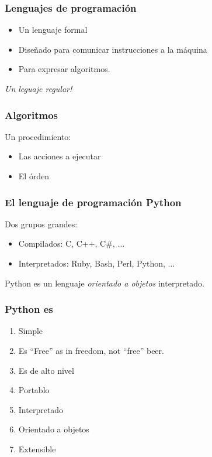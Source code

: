 \begin{frame}
\frametitle{Lenguajes de programaci\'on}
    \begin{itemize}
        \item Un lenguaje formal  \pause
        \item Dise\~nado para comunicar instrucciones a la m\'aquina \pause
        \item Para expresar algoritmos. \pause
    \end{itemize}
    \emph{ Un leguaje regular!}
\end{frame}


\begin{frame}
    \frametitle{Algoritmos}
    Un procedimiento:
    \begin{itemize}
        \item Las acciones a ejecutar
        \item El \'orden
    \end{itemize}
\end{frame}


\begin{frame}
    \frametitle{El lenguaje de programaci\'on Python}
    Dos grupos grandes:
    \begin{itemize}
        \item Compilados: C, C++, C\#, $\ldots$
        \item Interpretados: Ruby, Bash, Perl, Python, $\ldots$
    \end{itemize}
    Python es un lenguaje \emph{orientado a objetos} interpretado.
\end{frame}



\begin{frame}
    \frametitle{Python es}
    \begin{enumerate}
        \item Simple
        \item Es ``Free'' as in freedom, not ``free'' beer. \pause
        \item Es de alto nivel \pause
        \item Portablo \pause
        \item Interpretado \pause
        \item Orientado a objetos \pause
        \item Extensible \pause
    \end{enumerate}
\end{frame}

